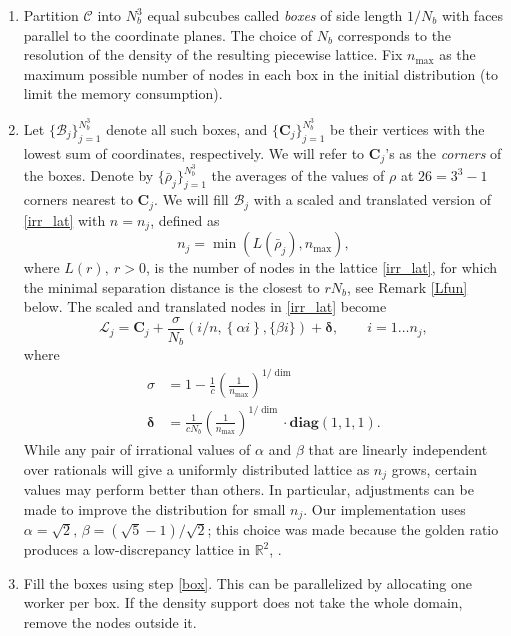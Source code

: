\documentclass{amsart}
\newcommand{\ndbox}{\mathcal{B}}
\newcommand{\lat}{\mathcal{L}}
\newcommand{\bs}[1]{\boldsymbol{#1}}
\theoremstyle{definition}
\begin{document}
\begin{enumerate}
	
	\item \label{subcubes}  Partition $\mathcal{C}$ into $N_b^3$ equal subcubes called \textit{boxes} of side length $1/N_b$ with faces parallel to the coordinate planes. The choice of $N_b$ corresponds to the resolution of the density of the resulting piecewise lattice.  Fix $n_\text{max}$ as the maximum possible number of nodes in each box in the initial distribution (to limit the memory consumption). 
	
	\item \label{box}  Let  $\{\ndbox_j\}_{j=1}^{N_b^3}$ denote all such boxes, and $\{\boldsymbol{C}_j\}_{j=1}^{N_b^3}$ be their vertices with the lowest sum of coordinates, respectively. We will refer to $ \bs{C}_j $'s as the \textit{corners} of the boxes. Denote by $\{\bar{\rho}_j\}_{j=1}^{N_b^3}$ the averages of the values of $\rho$ at $ 26 = 3^3-1 $ corners  nearest to $ \bs{C}_j $. We will fill $ \mathcal{B}_j $ with a scaled and translated version of \eqref{irr_lat} with $ n=n_j $, defined as 
	\[  n_j = \min(L(\bar{\rho}_j),n_\text{max}), \]
	where $ L(r),\ r>0 $, is the number of nodes in the lattice \eqref{irr_lat}, for which the minimal separation distance is the closest to $ r N_b $, see Remark \ref{Lfun} below.
	The scaled and translated nodes in \eqref{irr_lat} become
	\[ \lat_j =  \boldsymbol{C}_j + \frac{\sigma}{N_b}  \left({i}/{n}, \left\{\alpha{i} \right\}, \{ \beta {i}  \}\right)  + \bs{\delta}, \qquad i=1\dots n_j, \]
	where 
	\[ \begin{aligned}
	 \sigma&={ 1 - \frac{1}{c}\left(\frac{1}{n_\text{max}}\right)^{1/\dim} }\\
	 \bs{\delta}&=\frac{1}{cN_b }\left(\frac{1}{n_\text{max}}\right)^{1/\dim}\cdot \textbf{diag}(1,1,1). 
	\end{aligned}\]
	 While any pair of irrational values of $\alpha$ and $\beta$ that are linearly independent over rationals will give a uniformly distributed lattice as $n_j$ grows, certain values  may perform better than others. In particular, adjustments can be made to improve the distribution for small $n_j$. Our implementation uses $\alpha = \sqrt2,\,	 \beta = (\sqrt5-1)/\sqrt2$; this choice was made because the golden ratio produces a low-discrepancy lattice in $ \mathbb{R}^2 $, \cite{Bilyk2013}.
	
	\item \label{fill_boxes} Fill the boxes using step \eqref{box}. This can be parallelized by allocating one worker per box. If the density support does not take the whole domain, remove the nodes outside it.
	

\end{enumerate}
\end{document}
